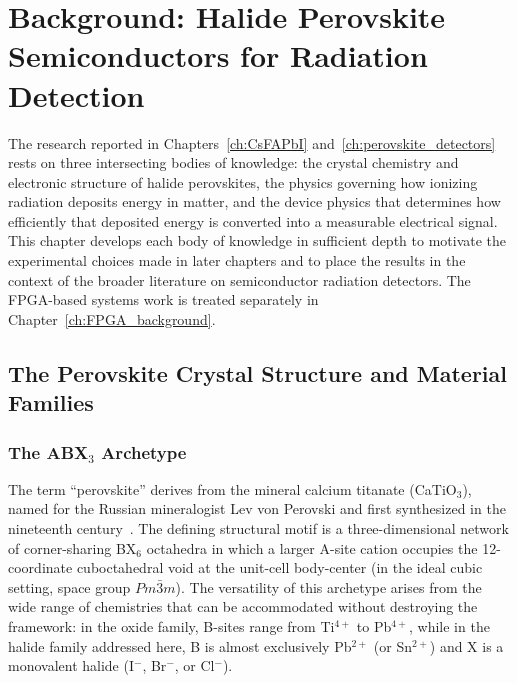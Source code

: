 
\chapter{Background: Halide Perovskite Semiconductors for Radiation Detection}

The research reported in Chapters~\ref{ch:CsFAPbI} and~\ref{ch:perovskite_detectors}
rests on three intersecting bodies of knowledge: the crystal chemistry and
electronic structure of halide perovskites, the physics governing how
ionizing radiation deposits energy in matter, and the device physics that
determines how efficiently that deposited energy is converted into a
measurable electrical signal.  This chapter develops each body of knowledge
in sufficient depth to motivate the experimental choices made in later
chapters and to place the results in the context of the broader literature
on semiconductor radiation detectors.  The FPGA-based systems work is
treated separately in Chapter~\ref{ch:FPGA_background}.

\section{The Perovskite Crystal Structure and Material Families}
\label{sec:perovskite_structure}

\subsection{The ABX$_3$ Archetype}

The term ``perovskite'' derives from the mineral calcium titanate
(CaTiO$_3$), named for the Russian mineralogist Lev von Perovski and
first synthesized in the nineteenth century~\cite{Wells1945}.  The
defining structural motif is a three-dimensional network of corner-sharing
BX$_6$ octahedra in which a larger A-site cation occupies the
12-coordinate cuboctahedral void at the unit-cell body-center (in the
ideal cubic setting, space group $Pm\bar{3}m$).  The versatility of this
archetype arises from the wide range of chemistries that can be
accommodated without destroying the framework: in the oxide family,
B-sites range from Ti$^{4+}$ to Pb$^{4+}$, while in the halide family
addressed here, B is almost exclusively Pb$^{2+}$ (or Sn$^{2+}$) and
X is a monovalent halide (I$^{-}$, Br$^{-}$, or Cl$^{-}$).


